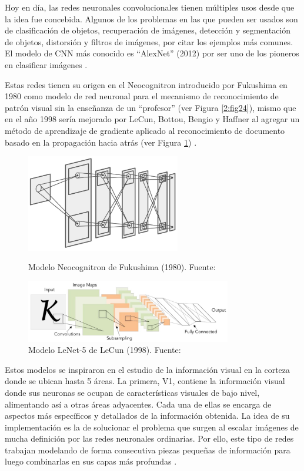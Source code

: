 \begin{itemize}
\begin{itemize}
		Hoy en día, las redes neuronales convolucionales tienen múltiples usos desde que la idea fue concebida. Algunos de los problemas en las que pueden ser usados son de clasificación de objetos, recuperación de imágenes, detección y segmentación de objetos, distorsión y filtros de imágenes, por citar los ejemplos más comunes. El modelo de CNN más conocido es “AlexNet” (2012) por ser uno de los pioneros en clasificar imágenes \parencite{tec_li2019cnn}.
		
		Estas redes tienen su origen en el Neocognitron introducido por Fukushima en 1980 como modelo de red neuronal para el mecanismo de reconocimiento de patrón visual sin la enseñanza de un “profesor” (ver Figura \ref{2:fig24}), mismo que en el año 1998 sería mejorado por LeCun, Bottou, Bengio y Haffner al agregar un método de aprendizaje de gradiente aplicado al reconocimiento de documento basado en la propagación hacia atrás (ver Figura \ref{2:fig25}) \parencite{tec_li2019cnn}.
		\begin{figure}[htbp]
			\begin{center}
				\includegraphics[width=0.6\textwidth]{2/figures/neocognitron.jpg}
				\caption{Modelo Neocognitron de Fukushima (1980). Fuente: \cite{tec_li2019cnn}}
				\label{2:fig24}
				
				\includegraphics[width=0.8\textwidth]{2/figures/lenet5.jpg}
				\caption{Modelo LeNet-5 de LeCun (1998). Fuente: \cite{tec_li2019cnn}}
				\label{2:fig25}
			\end{center}
		\end{figure}
		
		Estos modelos se inspiraron en el estudio de la información visual en la corteza donde se ubican hasta 5 áreas. La primera, V1, contiene la información visual donde sus neuronas se ocupan de características visuales de bajo nivel, alimentando así a otras áreas adyacentes. Cada una de ellas se encarga de aspectos más específicos y detallados de la información obtenida. La idea de su implementación es la de solucionar el problema que surgen al escalar imágenes de mucha definición por las redes neuronales ordinarias. Por ello, este tipo de redes trabajan modelando de forma consecutiva piezas pequeñas de información para luego combinarlas en sus capas más profundas \parencite{tec_lopez2016cnnTF}.
		

\end{itemize}
\end{itemize}
